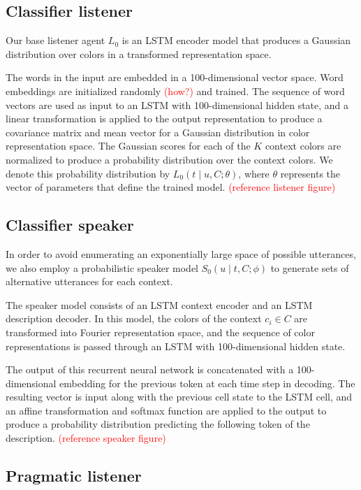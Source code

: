 \documentclass[11pt,letterpaper]{article}
\newcommand{\Listener}{L}
\newcommand{\Speaker}{S}
\newcommand{\utt}{u}
\newcommand{\referent}{c}
\newcommand{\context}{C}
\newcommand{\contextlen}{K}
\newcommand{\target}{t}
\renewcommand{\|}{\mid}
\newcommand{\todocheck}[1]{\textcolor{red}{#1}}
\begin{document}
\subsection{Classifier listener}

Our base listener agent $\Listener_0$ is an LSTM encoder model that produces a Gaussian
distribution over colors in a transformed representation space.

The words in the input are embedded in a 100-dimensional vector space. Word embeddings
are initialized randomly \todocheck{(how?)} and trained. The sequence of word vectors are
used as input to an LSTM with 100-dimensional hidden state, and a linear
transformation is applied to the output representation to produce a covariance matrix
and mean vector for a Gaussian distribution in color representation space. 
The Gaussian scores for each of the $\contextlen$ context colors are normalized to
produce a probability distribution over the context colors. We denote this probability
distribution by $\Listener_0(\target \| \utt, \context; \theta)$, where $\theta$ represents the
vector of parameters that define the trained model.
\todocheck{(reference listener figure)}

\subsection{Classifier speaker}\label{sec:s0}

In order to avoid enumerating an exponentially large space of possible utterances,
we also employ a probabilistic speaker model
$\Speaker_0(\utt \| \target, \context; \phi)$ to generate sets of alternative
utterances for each context.

The speaker model consists of an LSTM context encoder
and an LSTM description decoder. In this model, the colors of the context
$\referent_i \in \context$ are transformed into Fourier representation space,
and the sequence of color representations is passed through an LSTM with
100-dimensional hidden state.

The output of this recurrent neural network is concatenated with a
100-dimensional embedding for the previous token at each time step in decoding.
The resulting vector is input along with the previous cell state to the LSTM cell,
and an affine transformation and softmax function are applied to the output to
produce a probability distribution predicting the following token of the description.
\todocheck{(reference speaker figure)}

\subsection{Pragmatic listener}
\end{document}
